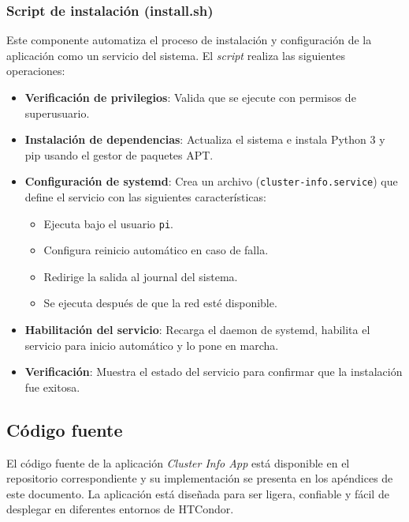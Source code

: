 \subsubsection{Script de instalación (install.sh)}
\noindent

Este componente automatiza el proceso de instalación y configuración de la aplicación como un servicio del sistema. El \textit{script} realiza las siguientes operaciones:

\begin{itemize}
	\item \textbf{Verificación de privilegios}: Valida que se ejecute con permisos de superusuario.

	\item \textbf{Instalación de dependencias}: Actualiza el sistema e instala Python 3 y pip usando el gestor de paquetes APT.

	\item \textbf{Configuración de systemd}: Crea un archivo (\texttt{cluster-info.service}) que define el servicio con las siguientes características:
	      \begin{itemize}
		      \item Ejecuta bajo el usuario \texttt{pi}.
		      \item Configura reinicio automático en caso de falla.
		      \item Redirige la salida al journal del sistema.
		      \item Se ejecuta después de que la red esté disponible.
	      \end{itemize}

	\item \textbf{Habilitación del servicio}: Recarga el daemon de systemd, habilita el servicio para inicio automático y lo pone en marcha.

	\item \textbf{Verificación}: Muestra el estado del servicio para confirmar que la instalación fue exitosa.
\end{itemize}

\subsection{Código fuente}
\noindent

El código fuente de la aplicación \textit{Cluster Info App} está disponible en el repositorio correspondiente y su implementación se presenta en los apéndices de este documento. La aplicación está diseñada para ser ligera, confiable y fácil de desplegar en diferentes entornos de HTCondor.

